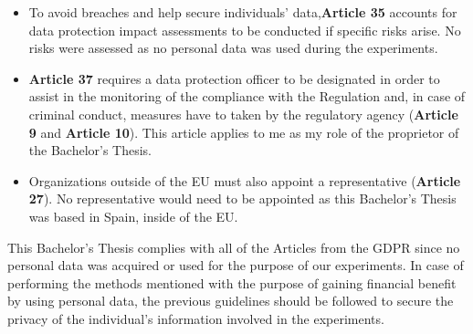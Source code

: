 \begin{itemize}
	\item To avoid breaches and help secure individuals' data,\textbf{Article 35} accounts for data protection impact assessments to be conducted if specific risks arise. No risks were assessed as no personal data was used during the experiments.
	
	\item \textbf{Article 37} requires a data protection officer to be designated in order to assist in the monitoring of the compliance with the Regulation and, in case of criminal conduct, measures have to taken by the regulatory agency (\textbf{Article 9} and \textbf{Article 10}). This article applies to me as my role of the proprietor of the Bachelor's Thesis.
	
	\item  Organizations outside of the EU must also appoint a representative (\textbf{Article 27}). No representative would need to be appointed as this Bachelor's Thesis was based in Spain, inside of the EU.
	
\end{itemize}  

This Bachelor's Thesis complies with all of the Articles from the GDPR since no personal data was acquired or used for the purpose of our experiments. In case of performing the methods mentioned with the purpose of gaining financial benefit by using personal data, the previous guidelines should be followed to secure the privacy of the individual's information involved in the experiments. \par




